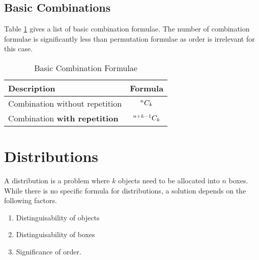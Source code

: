 \subsection{Basic Combinations}
Table \ref{tab:basic_combinations} gives a list of basic combination formulae. The number of combination formulae is significantly less than permutation formulae as order is irrelevant for this case.
\begin{table}[h]
    \renewcommand{\arraystretch}{1.5}
    \centering
    \begin{tabularx}{\textwidth}{Xc}
        \toprule
        \textbf{Description} & \textbf{Formula}\\
        \midrule
        Combination without repetition & \mbox{${}^{n}C_{k}$}\\
        Combination \textbf{with repetition} & \mbox{${}^{n+k-1}C_{k}$}\\
        \bottomrule
    \end{tabularx}
    \caption{Basic Combination Formulae}
    \label{tab:basic_combinations}
\end{table}

\section{Distributions}
A distribution is a problem where \mbox{$k$} objects need to be allocated into \mbox{$n$} boxes. While there is no specific formula for distributions, a solution depends on the following factors.
\begin{enumerate}
    \item Distinguisability of objects
    \item Distinguisability of boxes
    \item Significance of order.
\end{enumerate}